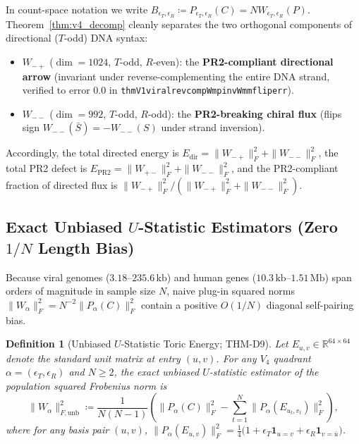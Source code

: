\documentclass[11pt, a4paper]{article}
\newtheorem{definition}[theorem]{Definition}
\DeclareRobustCommand{\_}{\textunderscore\allowbreak}
\begin{document}
In count-space notation we write $B_{\epsilon_T, \epsilon_R} \coloneqq P_{\epsilon_T, \epsilon_R}(C) = N W_{\epsilon_T, \epsilon_R}(P)$. Theorem~\ref{thm:v4_decomp} cleanly separates the two orthogonal components of directional ($T$-odd) DNA syntax:
\begin{itemize}
    \item $W_{-+}$ ($\dim = 1024$, $T$-odd, $R$-even): the \textbf{PR2-compliant directional arrow} (invariant under reverse-complementing the entire DNA strand, verified to error $0.0$ in \texttt{thmV1\_viral\_revcomp\_Wmp\_inv\_Wmm\_flip\_err}).
    \item $W_{--}$ ($\dim = 992$, $T$-odd, $R$-odd): the \textbf{PR2-breaking chiral flux} (flips sign $W_{--}(\bar{S}) = -W_{--}(S)$ under strand inversion).
\end{itemize}
Accordingly, the total directed energy is $E_{\mathrm{dir}} = \|W_{-+}\|_F^2 + \|W_{--}\|_F^2$, the total PR2 defect is $E_{\mathrm{PR2}} = \|W_{+-}\|_F^2 + \|W_{--}\|_F^2$, and the PR2-compliant fraction of directed flux is $\|W_{-+}\|_F^2 / (\|W_{-+}\|_F^2 + \|W_{--}\|_F^2)$.

\subsection{Exact Unbiased $U$-Statistic Estimators (Zero $1/N$ Length Bias)}

Because viral genomes ($3.18\text{--}235.6\,\mathrm{kb}$) and human genes ($10.3\,\mathrm{kb}\text{--}1.51\,\mathrm{Mb}$) span orders of magnitude in sample size $N$, naive plug-in squared norms $\|W_\alpha\|_F^2 = N^{-2}\|P_\alpha(C)\|_F^2$ contain a positive $O(1/N)$ diagonal self-pairing bias.

\begin{definition}[Unbiased $U$-Statistic Toric Energy; THM-D9]
\label{def:ustat}
Let $E_{u,v} \in \mathbb{R}^{64 \times 64}$ denote the standard unit matrix at entry $(u, v)$. For any $V_4$ quadrant $\alpha = (\epsilon_T, \epsilon_R)$ and $N \ge 2$, the exact unbiased $U$-statistic estimator of the population squared Frobenius norm is
\begin{equation}
    \|W_{\alpha}\|_{F,\mathrm{unb}}^2 \coloneqq \frac{1}{N(N-1)}\left(\|P_{\alpha}(C)\|_F^2 - \sum_{t=1}^{N} \|P_{\alpha}(E_{u_t, v_t})\|_F^2\right),
\end{equation}
where for any basis pair $(u,v)$, $\|P_{\alpha}(E_{u,v})\|_F^2 = \frac{1}{4}\bigl(1 + \epsilon_T \mathbf{1}_{u=v} + \epsilon_R \mathbf{1}_{v=\bar{u}}\bigr)$.
\end{definition}
\end{document}
